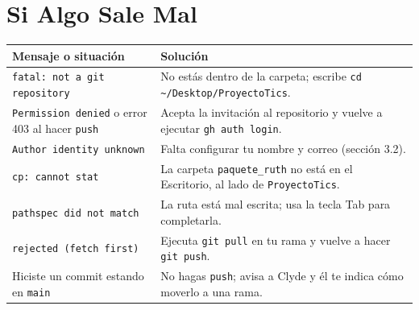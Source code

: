 \documentclass[11pt,a4paper]{article}
\begin{document}
\section{Si Algo Sale Mal}
{\small
{}
\noindent\begin{tabularx}{\textwidth}{@{}P{5.2cm} L@{}}
\toprule
{}
\textbf{Mensaje o situación} & \textbf{Solución} \\
\midrule
\texttt{fatal: not a git repository} & No estás dentro de la carpeta; escribe \nolinkurl{cd ~/Desktop/ProyectoTics}. \\
\texttt{Permission denied} o error 403 al hacer \texttt{push} & Acepta la invitación al repositorio y vuelve a ejecutar \texttt{gh auth login}. \\
\texttt{Author identity unknown} & Falta configurar tu nombre y correo (sección 3.2). \\
\texttt{cp: cannot stat} & La carpeta \texttt{paquete\_ruth} no está en el Escritorio, al lado de \texttt{ProyectoTics}. \\
\texttt{pathspec did not match} & La ruta está mal escrita; usa la tecla Tab para completarla. \\
\texttt{rejected (fetch first)} & Ejecuta \texttt{git pull} en tu rama y vuelve a hacer \texttt{git push}. \\
Hiciste un commit estando en \texttt{main} & No hagas \texttt{push}; avisa a Clyde y él te indica cómo moverlo a una rama. \\
\bottomrule
\end{tabularx}
}
\end{document}
